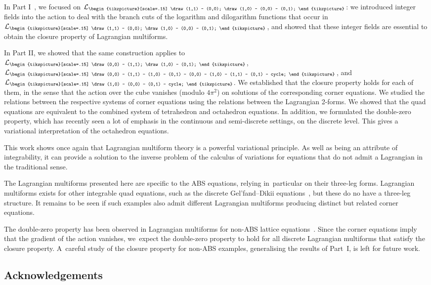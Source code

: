 \documentclass[pdftex]{sigma}
\newcommand{\crosssquare}{{\begin{tikzpicture}[scale=.15]
			\draw (0,0) -- (1,1) -- (1,0) -- (0,1) -- (0,0) -- (1,0) -- (1,1) -- (0,1) -- cycle;
\end{tikzpicture}}}
\newcommand{\cross}{{\begin{tikzpicture}[scale=.15]
			\draw (0,0) -- (1,1);
			\draw (1,0) -- (0,1);
\end{tikzpicture}}}
\newcommand{\triang}{{\begin{tikzpicture}[scale=.15]
			\draw (1,0) -- (0,0) -- (0,1) -- cycle;
\end{tikzpicture}}}
\newcommand{\trileg}{{\begin{tikzpicture}[scale=.15]
			\draw (1,1) -- (0,0);
			\draw (1,0) -- (0,0) -- (0,1);
\end{tikzpicture}}}
\newcommand{\cL}{\mathcal{L}}
\numberwithin{equation}{section}
\begin{document}
In Part I~\cite{richardson2025discrete1}, we focused on $\cL_\trileg$: we introduced integer fields into the action to deal with the branch cuts of the logarithm and dilogarithm functions that occur in $\cL_\trileg$, and showed that these integer fields are essential to obtain the closure property of Lagrangian multiforms.

In Part II, we showed that the same construction applies to $\cL_\cross$, $\cL_\crosssquare$, and $\cL_\triang$. We established that the closure property holds for each of them, in the sense that the action over the cube vanishes \big(modulo $4 \pi^2$\big) on solutions of the corresponding corner equations.
We studied the relations between the respective systems of corner equations using the relations between the Lagrangian 2-forms. We showed that the quad equations are equivalent to the combined system of tetrahedron and octahedron equations. In addition, we formulated the double-zero property, which has recently seen a lot of emphasis in the continuous and semi-discrete settings, on the discrete level. This gives a variational interpretation of the octahedron equations.

This work shows once again that Lagrangian multiform theory is a powerful variational principle. As well as being an attribute of integrability, it can provide a solution to the inverse problem of the calculus of variations for equations that do not admit a Lagrangian in the traditional sense.

The Lagrangian multiforms presented here are specific to the ABS equations, relying in~particular on their three-leg forms. Lagrangian multiforms exists for other integrable quad equations, such as the discrete Gel'fand--Dikii equations~\cite{lobb2010lagrangian}, but these do no have a three-leg structure. It remains to be seen if such examples also admit different Lagrangian multiforms producing distinct but related corner equations.

The double-zero property has been observed in Lagrangian multiforms for non-ABS lattice equations~\cite{nijhoff2024lagrangianb, nijhoff2024lagrangian}. Since the corner equations imply that the gradient of the action vanishes, we~expect the double-zero property to hold for all discrete Lagrangian multiforms that satisfy the closure property. A~careful study of the closure property for non-ABS examples, generalising the results of Part~I, is left for future work.

\subsection*{Acknowledgements}
\end{document}
